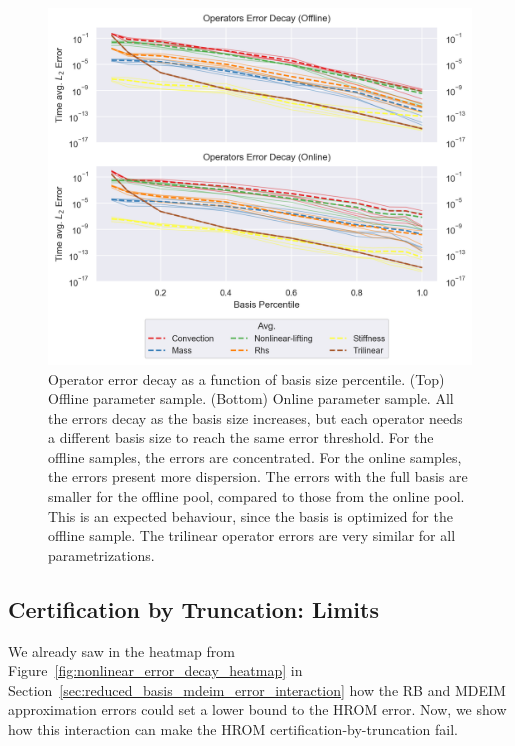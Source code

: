 \documentclass[../../thesis.tex]{subfiles}
\begin{document}
\begin{figure}[h]
    \includegraphics[width =\columnwidth]{research_project/piston/figures/nonlinear_displacement/separable/operators_error_decay_percentile.png}
    \caption{Operator error decay as a function of basis size percentile.
    (Top) Offline parameter sample.
    (Bottom) Online parameter sample.
    All the errors decay as the basis size increases, 
    but each operator needs a different basis size to reach the same error threshold.
    For the offline samples, the errors are concentrated.
    For the online samples, the errors present more dispersion.
    The errors with the full basis are smaller for the offline pool, 
    compared to those from the online pool.
    This is an expected behaviour, 
    since the basis is optimized for the offline sample.
    The trilinear operator errors are very similar for all parametrizations.}
    \label{fig:nlinear_disp_operators_error_decay}
\end{figure}

\clearpage
\subsection{Certification by Truncation: Limits}
We already saw in the heatmap from Figure~\ref{fig:nonlinear_error_decay_heatmap}
in Section~\ref{sec:reduced_basis_mdeim_error_interaction}
how the RB and MDEIM approximation errors could 
set a lower bound to the HROM error.
Now, we show how this interaction can make 
the HROM certification-by-truncation fail.
\end{document}
